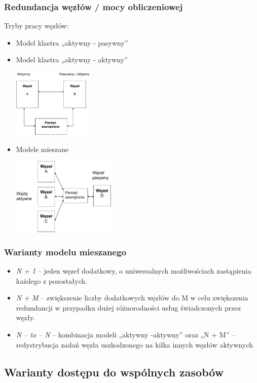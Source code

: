 \documentclass[a4paper,twoside]{article}
\begin{document}
\subsubsection{Redundancja węzłów / mocy obliczeniowej}
Tryby pracy węzłów:
\begin{itemize}
	\item Model klastra „aktywny - pasywny”
	\item Model klastra „aktywny - aktywny”
	\begin{center}
		\includegraphics[width=0.3\textwidth]{./images/klastry02}
	\end{center}
	\item Modele mieszane
	\begin{center}
		\includegraphics[width=0.4\textwidth]{./images/klastry03}
	\end{center}
\end{itemize}
\subsubsection{Warianty modelu mieszanego}
\begin{itemize}
	\item \emph{N + 1} – jeden węzeł dodatkowy, o uniwersalnych możliwościach zastąpienia każdego z pozostałych.
	\item \emph{N + M} – zwiększenie liczby dodatkowych węzłów do M w celu zwiększenia redundancji w przypadku dużej różnorodności usług świadczonych przez węzły.
	\item \emph{N – to – N} – kombinacja modeli „aktywny -aktywny” oraz „N + M” –redystrybucja zadań węzła uszkodzonego na kilka innych węzłów aktywnych
\end{itemize}
\subsection{Warianty dostępu do wspólnych zasobów}
\end{document}
